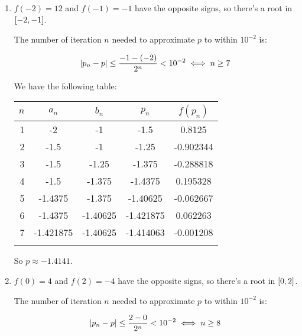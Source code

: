 \documentclass[../../Assignments.tex]{subfiles}
\begin{document}
\begin{solution}
    \begin{enumerate}[label=(\alph*)]
        \item \(f(-2) = 12\) and \(f(-1) = -1\) have the opposite signs, so
            there's a root in \(\interval{-2}{-1}\).

            The number of iteration \(n\) needed to approximate \(p\) to within
            \(10^{-2}\) is:

            \[\abs{p_n - p} \leq \frac{-1 - (-2)}{2^n} < 10^{-2} \iff n \geq 7\]

            We have the following table:

            \begin{tabular}{r S[table-format=-1.5] S[table-format=-1.5] S[table-format=-1.6] S[table-format=-1.6]}
                \\
                \toprule
                \(n\)  &  {\(a_n\)}  &  {\(b_n\)}  &  {\(p_n\)}  &  {\(f(p_n)\)}  \\
                  &  -2         &  -1         &  -1.5       &   0.8125       \\
                    2  &  -1.5       &  -1         &  -1.25      &  -0.902344     \\
                    3  &  -1.5       &  -1.25      &  -1.375     &  -0.288818     \\
                    4  &  -1.5       &  -1.375     &  -1.4375    &   0.195328     \\
                    5  &  -1.4375    &  -1.375     &  -1.40625   &  -0.062667     \\
                    6  &  -1.4375    &  -1.40625   &  -1.421875  &   0.062263     \\
                    7  &  -1.421875  &  -1.40625   &  -1.414063  &  -0.001208     \\
                \bottomrule
                \\
            \end{tabular}

            So \(p \approx \num{-1.4141}\).

        \item \(f(0) = 4\) and \(f(2) = -4\) have the opposite signs, so there's
            a root in \(\interval{0}{2}\).

            The number of iteration \(n\) needed to approximate \(p\) to within
            \(10^{-2}\) is:

            \[\abs{p_n - p} \leq \frac{2 - 0}{2^n} < 10^{-2} \iff n \geq 8\]


\end{enumerate}
\end{solution}
\end{document}
